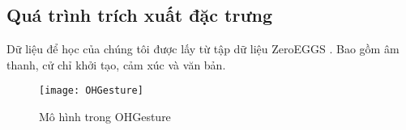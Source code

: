 \subsection{Quá trình trích xuất đặc trưng}

Dữ liệu để học của chúng tôi được lấy từ tập dữ liệu ZeroEGGS \cite{ghorbani2022zeroeggszeroshotexamplebasedgesture}. Bao gồm âm thanh, cử chỉ khởi tạo, cảm xúc và văn bản.
\begin{figure}[H]
	\centering
	\texttt{[image: OHGesture]}
	\caption{Mô hình trong OHGesture}
	\label{fig:OHGesture}
\end{figure}
\vspace{-10pt}

